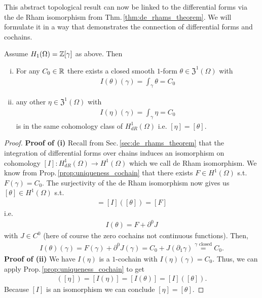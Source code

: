 \documentclass[../master_thesis.tex]{subfiles}
\begin{document}
This abstract topological result can now be linked to the differential 
forms via the de Rham isomorphism from Thm.\,\ref{thm:de_rhams_theorem}. 
We will formulate it in a way 
that demonstrates the connection of differential forms and cochains.
\begin{corollary}\label{cor:existence_uniqueness_1form}
    Assume $H_1(\Omega) = \mathbb{Z} [\gamma]$ as above. Then
    \begin{enumerate}[(i)]
        \item For any $C_0 \in \mathbb{R}$ there exists a closed smooth $1$-form 
            $\theta \in \mathfrak{Z}^1(\Omega)$ with 
            \begin{align*}
                I(\theta)(\gamma) = \int_\gamma \theta = C_0
            \end{align*}
        \item any other $\eta \in \mathfrak{Z}^1(\Omega)$ with 
            \begin{align*}
                I(\eta)(\gamma) = \int_\gamma \eta = C_0
            \end{align*}
            is in the same cohomology class of $H_{dR}^1(\Omega)$ 
            i.e. $[\eta] = [\theta]$.
    \end{enumerate}
\end{corollary}

\begin{proof}
    \textbf{Proof of (i)}
    Recall from Sec.\,\ref{sec:de_rhams_theorem} 
    that the integration of differential forms 
    over chains induces an isomorphism on cohomology 
    $[I]: H_{dR}^1(\Omega) \rightarrow H^1(\Omega)$ which we call 
    de Rham isomorphism. We know from 
    Prop.\,\ref{prop:uniqueness_cochain} that there exists $F\in H^1(\Omega)$ 
    s.t. $F(\gamma) = C_0$. The surjectivity of the de Rham isomorphism 
    now gives us $[\theta] \in H^1(\Omega)$ s.t.
    \begin{align*}
        [I(\theta)] = [I]([\theta]) = [F]
    \end{align*}
    i.e.
    \begin{align*}
        I(\theta) = F + \partial^0 J
    \end{align*}
    with $J \in C^0$ (here of course the zero cochains not continuous functions). 
    Then, 
    \begin{align*}
        I(\theta)(\gamma) = F(\gamma) + \partial^0 J(\gamma) 
        = C_0 + J(\partial_1 \gamma) 
        \stackrel{\text{$\gamma$ closed}}{=} C_0. 
    \end{align*}
    \textbf{Proof of (ii)}
    We have $I(\eta)$ is a $1$-cochain with $I(\eta)(\gamma) = C_0$.
    Thus, we can apply Prop.\,\ref{prop:uniqueness_cochain} to get
    \begin{align*}
        [I]([\eta])=[I(\eta)] = [I(\theta)]=[I]([\theta]).
    \end{align*}
    Because $[I]$ is an isomorphism we can conclude $[\eta] = [\theta]$.
\end{proof}
\end{document}
